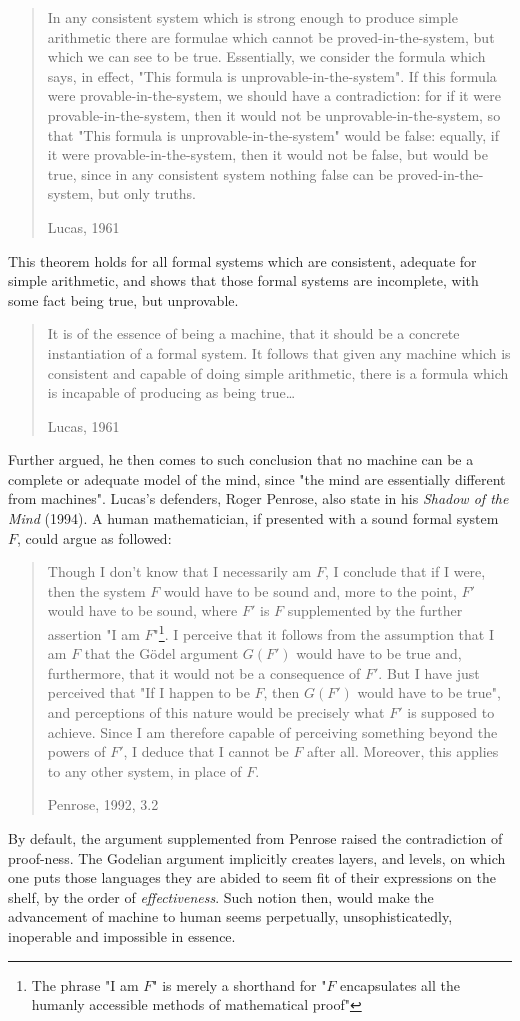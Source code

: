 \blockquote[Lucas, 1961]{In any consistent system which is strong enough to produce simple arithmetic there are formulae which cannot be proved-in-the-system, but which we can see to be true. Essentially, we consider the formula which says, in effect, "This formula is unprovable-in-the-system". If this formula were provable-in-the-system, we should have a contradiction: for if it were provable-in-the-system, then it would not be unprovable-in-the-system, so that "This formula is unprovable-in-the-system" would be false: equally, if it were provable-in-the-system, then it would not be false, but would be true, since in any consistent system nothing false can be proved-in-the-system, but only truths.}
This theorem holds for all formal systems which are consistent, adequate for simple arithmetic, and shows that those formal systems are incomplete, with some fact being true, but unprovable.
\blockquote[Lucas, 1961]{It is of the essence of being a machine, that it should be a concrete instantiation of a formal system. It follows that given any machine which is consistent and capable of doing simple arithmetic, there is a formula which is incapable of producing as being true\dots}

Further argued, he then comes to such conclusion that no machine can be a complete or adequate model of the mind, since "the mind are essentially different from machines". Lucas's defenders, Roger Penrose, also state in his \textit{Shadow of the Mind} (1994). A human mathematician, if presented with a sound formal system $F$, could argue as followed:
\blockquote[Penrose, 1992, 3.2]{Though I don't know that I necessarily am $F$, I conclude that if I were, then the system $F$ would have to be sound and, more to the point, $F'$ would have to be sound, where $F'$ is $F$ supplemented by the further assertion "I am $F$"\footnote{The phrase "I am $F$" is merely a shorthand for "$F$ encapsulates all the humanly accessible methods of mathematical proof"}. I perceive that it follows from the assumption that I am $F$ that the Gödel argument $G(F')$ would have to be true and, furthermore, that it would not be a consequence of $F'$. But I have just perceived that "If I happen to be $F$, then $G(F')$ would have to be true", and perceptions of this nature would be precisely what $F'$ is supposed to achieve. Since I am therefore capable of perceiving something beyond the powers of $F'$, I deduce that I cannot be $F$ after all. Moreover, this applies to any other system, in place of $F$.}

By default, the argument supplemented from Penrose raised the contradiction of proof-ness. The Godelian argument implicitly creates layers, and levels, on which one puts those languages they are abided to seem fit of their expressions on the shelf, by the order of \textit{effectiveness}. Such notion then, would make the advancement of machine to human seems perpetually, unsophisticatedly, inoperable and impossible in essence.

